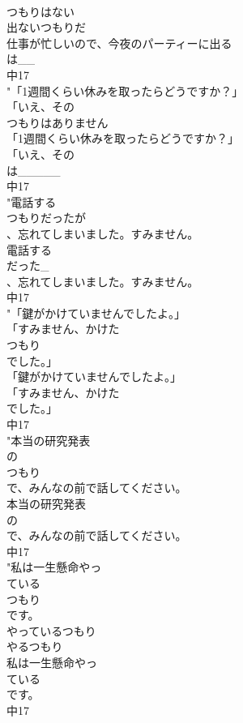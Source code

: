 \documentclass[8pt]{extreport}
\begin{document}
\begin{CJK}{UTF8}{min}
\\	つもりはない
\\	出ないつもりだ
\\	仕事が忙しいので、今夜のパーティーに出る
\\	は__
\\	中17
\\	"「1週間くらい休みを取ったらどうですか？」
\\	「いえ、その
\\	つもりはありません
\\	「1週間くらい休みを取ったらどうですか？」
\\	「いえ、その
\\	は_____
\\	中17
\\	"電話する
\\	つもりだったが
\\	、忘れてしまいました。すみません。
\\	電話する
\\	だった_
\\	、忘れてしまいました。すみません。
\\	中17
\\	"「鍵がかけていませんでしたよ。」
\\	「すみません、かけた
\\	つもり
\\	でした。」
\\	「鍵がかけていませんでしたよ。」
\\	「すみません、かけた
\\	でした。」
\\	中17
\\	"本当の研究発表
\\	の
\\	つもり
\\	で、みんなの前で話してください。
\\	本当の研究発表
\\	の
\\	で、みんなの前で話してください。
\\	中17
\\	"私は一生懸命やっ
\\	ている
\\	つもり
\\	です。
\\	やっているつもり　
\\	やるつもり 
\\	私は一生懸命やっ
\\	ている
\\	です。
\\	中17

\end{CJK}
\end{document}
